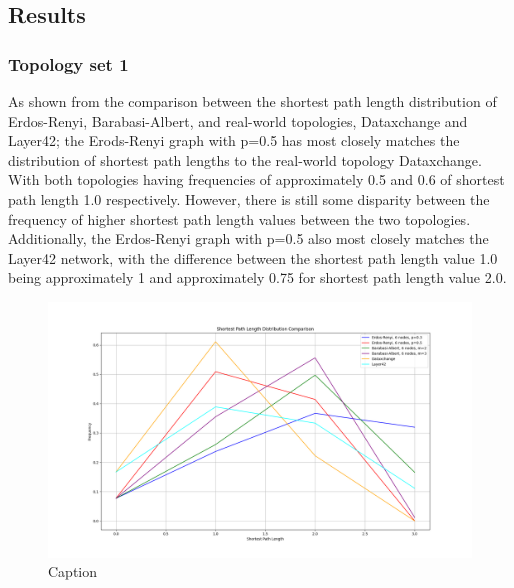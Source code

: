 

\subsection{Results}


\subsubsection{Topology set 1}
As shown from the comparison between the shortest path length distribution of Erdos-Renyi, Barabasi-Albert, and real-world topologies, Dataxchange and Layer42; the Erods-Renyi graph with p=0.5 has most closely matches the distribution of shortest path lengths to the real-world topology Dataxchange. With both topologies having frequencies of approximately 0.5 and 0.6 of shortest path length 1.0 respectively. However, there is still some disparity between the frequency of higher shortest path length values between the two topologies. Additionally, the Erdos-Renyi graph with p=0.5 also most closely matches the Layer42 network, with the difference between the shortest path length value 1.0 being approximately 1 and approximately 0.75 for shortest path length value 2.0.  

\begin{figure}
    \centering
    \includegraphics[width=0.9\linewidth]{images/FINAL-TOPO-COMP/line-6.png}
    \caption{Caption}
    \label{fig:enter-label}
\end{figure}

